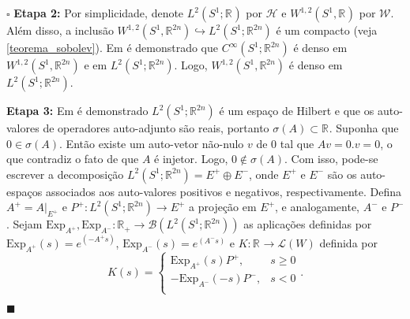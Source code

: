 \documentclass[12pt]{book}
\newenvironment{prova}[1]{$\square$ #1}{\hfill$\blacksquare$}
\newcommand{\circulo}{S^{1}}
\newcommand{\espacoLdois}[1]{L^{2}(#1)}
\newcommand{\espacosobolevdois}[2]{\espacosobolevgeral{2}{#1, #2}}
\newcommand{\espacosobolevgeral}[2]{W^{1,#1}(#2)}
\newcommand{\espectrooperador}[1]{\sigma(#1)}
\newcommand{\Exp}{\text{Exp}}
\newcommand{\funcaocond}[5]{
	#1 = 
	\left\{
	\begin{array}{cc}
		#2, & #3\\
		#4, & #5\\
	\end{array}
	\right.
}
\newcommand{\real}[1]{\mathbb{R}^{#1}}
\newcommand{\reta}{\real{}}
\begin{document}
\begin{prova}
		\textbf{Etapa 2:} Por simplicidade, denote $\espacoLdois{\circulo;\reta}$ por $\mathcal{H}$ e $\espacosobolevdois{\circulo}{\reta}$ por $\mathcal{W}$. Além disso, a inclusão $\espacosobolevdois{\circulo}{\real{2n}} \hookrightarrow \espacoLdois{\circulo;\real{2n}}$ é um compacto (veja \ref{teorema_sobolev}). Em \cite{breazis_sobolev_spaces} é demonstrado que $C^{\infty}(\circulo;\real{2n})$ é denso em $\espacosobolevdois{\circulo}{\real{2n}}$ e em $\espacoLdois{\circulo;\real{2n}}$. Logo, $\espacosobolevdois{\circulo}{\real{2n}}$ é denso em  $\espacoLdois{\circulo;\real{2n}}$.
		
		\textbf{Etapa 3:} Em \cite{kreyszig_analise_funcional} é demonstrado $ \espacoLdois{\circulo;\real{2n}}$ é um espaço de Hilbert e que os auto-valores de operadores auto-adjunto são reais, portanto $\espectrooperador{A}\subset \reta$. Suponha que $0 \in \espectrooperador{A}$. Então existe um auto-vetor não-nulo $v$ de $0$ tal que $Av=0.v=0$, o que contradiz o fato de que $A$ é injetor. Logo, $0\notin \espectrooperador{A}$. Com isso, pode-se escrever a decomposição $\espacoLdois{\circulo;\real{2n}}=E^{+}\oplus E^{-}$, onde $E^{+}$ e $E^{-}$ são os auto-espaços associados aos auto-valores positivos e negativos, respectivamente. Defina $A^{+}=A |_{E^{+}}$ e $P^{+}: \espacoLdois{\circulo;\real{2n}} \to E^{+}$ a projeção em $E^{+}$, e analogamente, $A^{-}$ e $P^{-}$. Sejam $\Exp_{A^{+}}, \Exp_{A^{-}}: \real{}_{+} \to  \mathcal{B}(\espacoLdois{\circulo;\real{2n}})$ as aplicações definidas por $\Exp_{A^{+}}(s) = e^{(-A^{+}s)}$, $\Exp_{A^{-}}(s) = e^{(A^{-}s)}$ e $K: \real{}\to \mathcal{L}(W)$ definida por
		$$
		\funcaocond{K(s)}{\Exp_{A^{+}}(s)P^{+}}{s \geq 0}{-\Exp_{A^{-}}(-s)P^{-}}{s<0}.
		$$
	

\end{prova}
\end{document}
